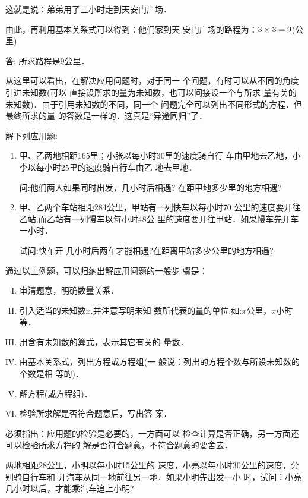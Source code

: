 这就是说：弟弟用了三小时走到天安门广场．

由此，再利用基本关系式可以得到：他们家到天
安门广场的路程为：$3\times3= 9$(公里)
    
答: 所求路程是9公里．

从这里可以看出，在解决应用问题时，对于同一
个间题，有时可以从不同的角度引进未知数(可以
直接设所求的量为未知数，也可以间接设一个与所求
量有关的未知数)．由于引用未知数的不同，同一个
问题完全可以列出不同形式的方程．但最终所求的量
的答数是一样的．这真是“异途同归”了．


\begin{ex}
    解下列应用题:
\begin{enumerate}
    \item 甲、乙两地相距165里；小张以每小时30里的速度骑自行
    车由甲地去乙地，小李以每小时25里的速度骑自行车由乙
    地去甲地．
    
    问:他们两人如果同时出发，几小时后相遇?
    在距甲地多少里的地方相遇?
    \item 甲、乙两个车站相距284公里，甲站有一列快车以每小时70
    公里的速度要开往乙站;而乙站有一列慢车以每小时48公
    里的速度要开往甲站．如果慢车先开车一小时．
    
    试问:快车开
    几小时后两车才能相遇?在距离甲站多少公里的地方相遇?
\end{enumerate}
\end{ex}    
    
通过以上例题，可以归纳出解应用问题的一般步
骤是：

\begin{blk}{}
\begin{enumerate}[I. ]
    \item 审清题意，明确数量关系．
    \item 引入适当的未知数$x$.并注意写明未知
    数所代表的量的单位.如:$x$公里，$x$小时等．
    \item 用含有未知数的算式，表示其它有关的
    量数．
    \item 由基本关系式，列出方程或方程组(一
    般说：列出的方程个数与所设未知数的个数是相
    等的)．
    \item 解方程(或方程组)．
    \item 检验所求解是否符合题意后，写出答
    案．
\end{enumerate}
\end{blk}

必须指出：应用题的检验是必要的，一方面可以
检查计算是否正确，另一方面还可以检验所求方程的
解是否符合题意，不符合题意的要舍去．

\begin{example}
    两地相距28公里，小明以每小时15公里的
速度，小亮以每小时30公里的速度，分别骑自行车和
开汽车从同一地前往另一地．如果小明先出发一小
时，试问：小亮几小时以后，才能乘汽车追上小明?
\end{example}

